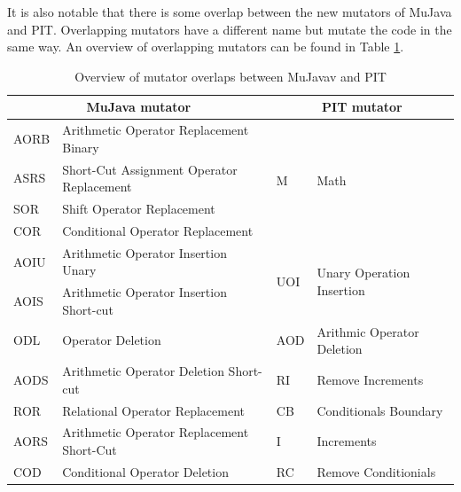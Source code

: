 \documentclass[conference,draftclsnofoot,onecolumn]{IEEEtran}
\begin{document}
It is also notable that there is some overlap between the new mutators of MuJava and PIT. 
Overlapping mutators have a different name but mutate the code in the same way. 
An overview of overlapping mutators can be found in Table \ref{tab:mutators-overlap}.

\begin{table}[ht]
\centering
\begin{tabular}{|l|l|l|l|}
\hline
\multicolumn{2}{|c|}{\textbf{ MuJava mutator}}      & \multicolumn{2}{c|}{\textbf{PIT mutator}}                         \\ \hline
AORB & Arithmetic Operator Replacement Binary      & \multirow{4}{*}{M}   & \multirow{4}{*}{Math}                      \\ \cline{1-2}
ASRS & Short-Cut Assignment   Operator Replacement &                      &                                            \\ \cline{1-2}
SOR  & Shift Operator   Replacement                &                      &                                            \\ \cline{1-2}
COR  & Conditional Operator   Replacement          &                      &                                            \\ \hline
AOIU & Arithmetic Operator   Insertion Unary       & \multirow{2}{*}{UOI} & \multirow{2}{*}{Unary Operation Insertion} \\ \cline{1-2}
AOIS & Arithmetic Operator   Insertion Short-cut   &                      &                                            \\ \hline
ODL  & Operator Deletion                           & AOD                  & Arithmic Operator   Deletion               \\ \hline
AODS & Arithmetic Operator   Deletion Short-cut    & RI                   & Remove Increments                          \\ \hline
ROR  & Relational Operator   Replacement           & CB                   & Conditionals Boundary                      \\ \hline
AORS & Arithmetic Operator   Replacement Short-Cut & I                    & Increments                                 \\ \hline
COD  & Conditional Operator   Deletion             & RC                   & Remove Conditionials                       \\ \hline

\end{tabular}
\caption{\label{tab:mutators-overlap}Overview of mutator overlaps between  MuJavav and PIT}
\end{table}
\end{document}
